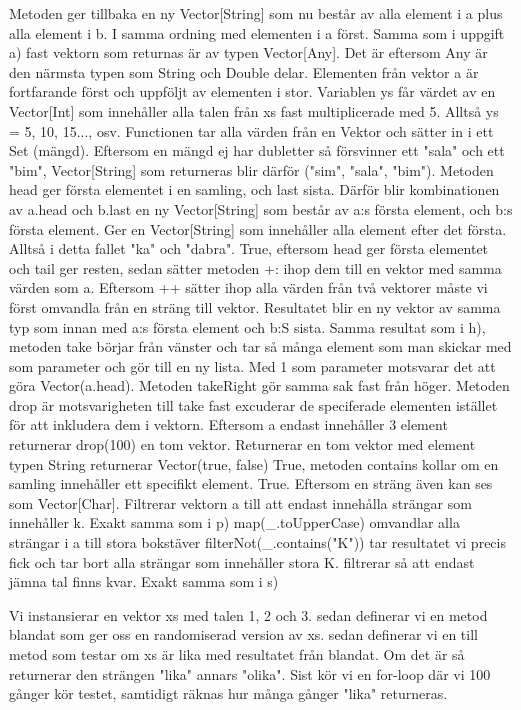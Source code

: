 \Subtask 
Metoden ger tillbaka en ny Vector[String] som nu består av alla element i a plus alla element i b. I samma ordning med elementen i a först.
\Subtask 
Samma som i uppgift a) fast vektorn som returnas är av typen Vector[Any]. Det är eftersom Any är den närmsta typen som String och Double delar. Elementen från vektor a är fortfarande först och uppföljt av elementen i stor.
\Subtask 
Variablen ys får värdet av en Vector[Int] som innehåller alla talen från xs fast multiplicerade med 5. Alltså ys = 5, 10, 15..., osv.
\Subtask 
Functionen tar alla värden från en Vektor och sätter in i ett Set (mängd). Eftersom en mängd ej har dubletter så försvinner ett "sala" och ett "bim", Vector[String] som returneras blir därför ("sim", "sala", "bim").
\Subtask 
Metoden head ger första elementet i en samling, och last sista. Därför blir kombinationen av a.head och b.last en ny Vector[String] som består av a:s första element, och b:s första element.
\Subtask 
Ger en Vector[String] som innehåller alla element efter det första. Alltså i detta fallet "ka" och "dabra".
\Subtask 
True, eftersom head ger första elementet och tail ger resten, sedan sätter metoden +: ihop dem till en vektor med samma värden som a.
\Subtask 
Eftersom ++ sätter ihop alla värden från två vektorer måste vi först omvandla från en sträng till vektor. Resultatet blir en ny vektor av samma typ som innan med a:s första element och b:S sista.
\Subtask 
Samma resultat som i h), metoden take börjar från vänster och tar så många element som man skickar med som parameter och gör till en ny lista. Med 1 som parameter motsvarar det att göra Vector(a.head). Metoden takeRight gör samma sak fast från höger.
\Subtask 
Metoden drop är motsvarigheten till take fast excuderar de speciferade elementen istället för att inkludera dem i vektorn.
\Subtask 
Eftersom a endast innehåller 3 element returnerar drop(100) en tom vektor.
\Subtask 
Returnerar en tom vektor med element typen String
\Subtask 
returnerar Vector(true, false) 
\Subtask 
True, metoden contains kollar om en samling innehåller ett specifikt element.
\Subtask 
True. Eftersom en sträng även kan ses som Vector[Char].
\Subtask 
Filtrerar vektorn a till att endast innehålla strängar som innehåller k.
\Subtask 
Exakt samma som i p)
\Subtask 
map(_.toUpperCase) omvandlar alla strängar i a till stora bokstäver
filterNot(_.contains("K")) tar resultatet vi precis fick och tar bort alla strängar som innehåller stora K.
\Subtask 
filtrerar så att endast jämna tal finns kvar.
\Subtask 
Exakt samma som i s)

\Task %
\Subtask 
Vi instansierar en vektor xs med talen 1, 2 och 3.
sedan definerar vi en metod blandat som ger oss en randomiserad version av xs.
sedan definerar vi en till metod som testar om xs är lika med resultatet från blandat. Om det är så returnerar den strängen "lika" annars "olika".
Sist kör vi en for-loop där vi 100 gånger kör testet, samtidigt räknas hur många gånger "lika" returneras.

